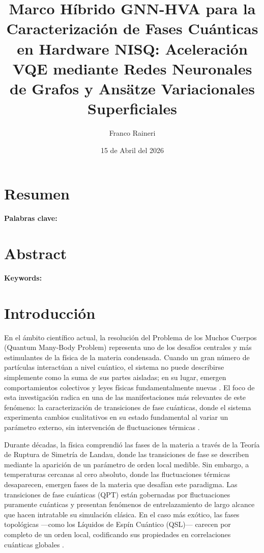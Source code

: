 \documentclass[11pt,a4paper,spanish]{book}
\title{Marco Híbrido GNN-HVA para la Caracterización de Fases Cuánticas en Hardware NISQ: Aceleración VQE mediante Redes Neuronales de Grafos y Ansätze Variacionales Superficiales}
\author{Franco Raineri}
\date{15 de Abril del
 2026}
\begin{document}
\renewcommand{\listfigurename}{Índice de figuras}
\renewcommand{\listtablename}{Índice de tablas}
\renewcommand{\contentsname}{Índice de contenidos}
\renewcommand{\figurename}{Figura}
\renewcommand{\tablename}{Tabla}

\maketitle
\frontmatter
\tableofcontents
\listoffigures

\listoftables


\chapter{Resumen}


\vspace{0.5cm}
{\bf Palabras clave:}

\chapter{Abstract}

\vspace{0.5cm}
{\bf Keywords:}

\mainmatter

\chapter{Introducción}

En el ámbito científico actual, la resolución del Problema de los Muchos Cuerpos (Quantum Many-Body Problem) representa uno de los desafíos centrales y más estimulantes de la física de la materia condensada. Cuando un gran número de partículas interactúan a nivel cuántico, el sistema no puede describirse simplemente como la suma de sus partes aisladas; en su lugar, emergen comportamientos colectivos y leyes físicas fundamentalmente nuevas \citep{anderson1972}. El foco de esta investigación radica en una de las manifestaciones más relevantes de este fenómeno: la caracterización de transiciones de fase cuánticas, donde el sistema experimenta cambios cualitativos en su estado fundamental al variar un parámetro externo, sin intervención de fluctuaciones térmicas \citep{dutta2015}.

Durante décadas, la física comprendió las fases de la materia a través de la Teoría de Ruptura de Simetría de Landau, donde las transiciones de fase se describen mediante la aparición de un parámetro de orden local medible. Sin embargo, a temperaturas cercanas al cero absoluto, donde las fluctuaciones térmicas desaparecen, emergen fases de la materia que desafían este paradigma. Las transiciones de fase cuánticas (QPT) están gobernadas por fluctuaciones puramente cuánticas y presentan fenómenos de entrelazamiento de largo alcance que hacen intratable su simulación clásica. En el caso más exótico, las fases topológicas ---como los Líquidos de Espín Cuántico (QSL)--- carecen por completo de un orden local, codificando sus propiedades en correlaciones cuánticas globales \citep{savary2016}.
\end{document}
